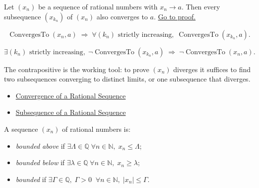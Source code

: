 \begin{theorem}
\label{thm:subsequence-convergence-q}
Let $(x_n)$ be a sequence of rational numbers with $x_n \to a$.
Then every subsequence $(x_{k_n})$ of $(x_n)$ also converges to $a$.
\hyperref[prf:subsequence-convergence-q]{Go to proof.}
\end{theorem}

\begin{remark*}
\[
\operatorname{ConvergesTo}(x_n, a)
\;\Longrightarrow\;
\forall (k_n) \text{ strictly increasing},\;
\operatorname{ConvergesTo}(x_{k_n}, a).
\]
\end{remark*}

\begin{remark*}
\[
\exists (k_n) \text{ strictly increasing},\;
\neg\operatorname{ConvergesTo}(x_{k_n}, a)
\;\Longrightarrow\;
\neg\operatorname{ConvergesTo}(x_n, a).
\]
\end{remark*}

\begin{remark*}[Interpretation]
The contrapositive is the working tool: to prove $(x_n)$ diverges it suffices
to find two subsequences converging to distinct limits, or one subsequence
that diverges.
\end{remark*}

\begin{remark*}[Dependencies]
\begin{itemize}
  \item \hyperref[def:convergent-rational-sequence]{Convergence of a Rational Sequence}
  \item \hyperref[def:subsequence-q]{Subsequence of a Rational Sequence}
\end{itemize}
\end{remark*}

\begin{definition}
\label{def:bounded-sequence-q}
A sequence $(x_n)$ of rational numbers is:
\begin{itemize}
  \item \emph{bounded above} if $\exists \Lambda \in \mathbb{Q}\; \forall n \in \mathbb{N},\;
        x_n \leq \Lambda$;
  \item \emph{bounded below} if $\exists \lambda \in \mathbb{Q}\; \forall n \in \mathbb{N},\;
        x_n \geq \lambda$;
  \item \emph{bounded} if $\exists \Gamma \in \mathbb{Q},\;\Gamma>0\;\;
        \forall n \in \mathbb{N},\; |x_n| \leq \Gamma$.
\end{itemize}
\end{definition}

